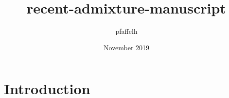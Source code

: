 \documentclass{article}
\title{recent-admixture-manuscript}
\author{pfaffelh }
\date{November 2019}
\begin{document}
\maketitle

\section{Introduction}
\end{document}
